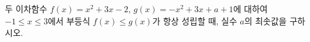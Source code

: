 두 이차함수 $f(x)=x^2+3x-2$, $g(x)=-x^2+3x+a+1$에 대하여 $-1\le x\le 3$에서 부등식 $f(x)\le g(x)$가 항상 성립할 때, 실수 $a$의 최솟값을 구하시오.
